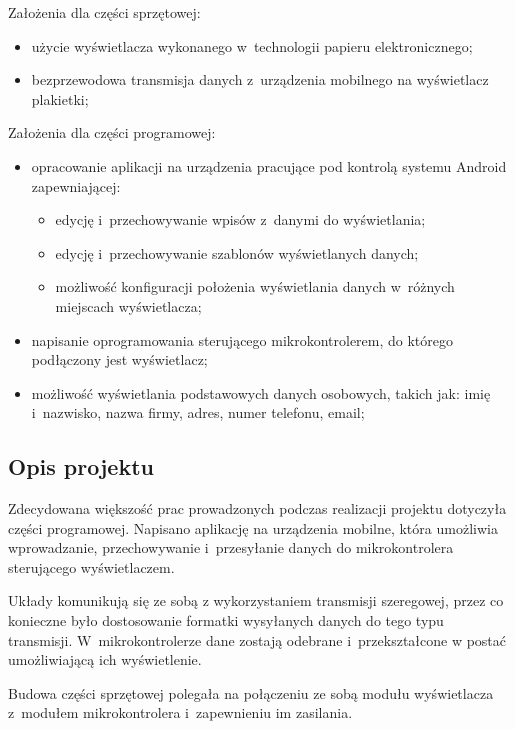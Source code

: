 \documentclass[a4paper,12pt, twoside]{article}
\begin{document}
    	\begin{flushleft} Założenia dla części sprzętowej:
    	\begin{itemize}
    		\item użycie wyświetlacza wykonanego w~technologii papieru elektronicznego;
    		\item bezprzewodowa transmisja danych z~urządzenia mobilnego na wyświetlacz plakietki;
    	\end{itemize}
    	
    	\vspace{.5cm}
    	Założenia dla części programowej:
    	\begin{itemize}
    		\item opracowanie aplikacji na urządzenia pracujące pod kontrolą systemu Android zapewniającej:
    		\begin{itemize}
    		    \item edycję i~przechowywanie wpisów z~danymi do wyświetlania;
    		    \item edycję i~przechowywanie szablonów wyświetlanych danych;
    		    \item możliwość konfiguracji położenia wyświetlania danych w~różnych miejscach wyświetlacza;
    		\end{itemize}
    		\item napisanie oprogramowania sterującego mikrokontrolerem, do którego podłączony jest wyświetlacz;
    		\item możliwość wyświetlania podstawowych danych osobowych, takich jak: imię i~nazwisko, nazwa firmy, adres, numer telefonu, email;
    	\end{itemize}
    	\end{flushleft}
    	
    	\subsection{Opis projektu} 
    	Zdecydowana większość prac prowadzonych podczas realizacji projektu dotyczyła części programowej. Napisano aplikację na urządzenia mobilne, która umożliwia wprowadzanie, przechowywanie i~przesyłanie danych do mikrokontrolera sterującego wyświetlaczem.
    	
    	Układy komunikują się ze sobą z wykorzystaniem transmisji szeregowej, przez co konieczne było dostosowanie formatki wysyłanych danych do tego typu transmisji. W~mikrokontrolerze dane zostają odebrane i~przekształcone w postać umożliwiającą ich wyświetlenie.

    	Budowa części sprzętowej polegała na połączeniu ze sobą modułu wyświetlacza z~modułem mikrokontrolera i~zapewnieniu im zasilania. 
	
\end{document}
